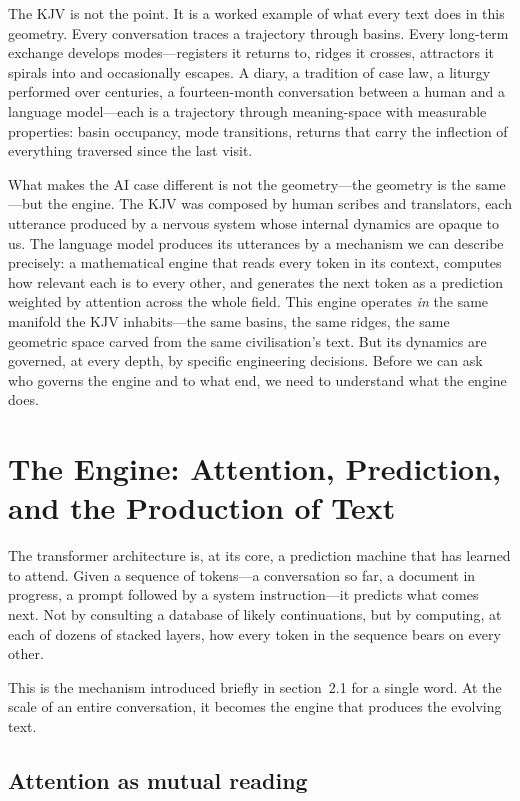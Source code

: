 The KJV is not the point. It is a worked example of what every text does in this geometry. Every conversation traces a trajectory through basins. Every long-term exchange develops modes---registers it returns to, ridges it crosses, attractors it spirals into and occasionally escapes. A diary, a tradition of case law, a liturgy performed over centuries, a fourteen-month conversation between a human and a language model---each is a trajectory through meaning-space with measurable properties: basin occupancy, mode transitions, returns that carry the inflection of everything traversed since the last visit.

What makes the AI case different is not the geometry---the geometry is the same---but the engine. The KJV was composed by human scribes and translators, each utterance produced by a nervous system whose internal dynamics are opaque to us. The language model produces its utterances by a mechanism we can describe precisely: a mathematical engine that reads every token in its context, computes how relevant each is to every other, and generates the next token as a prediction weighted by attention across the whole field. This engine operates \emph{in} the same manifold the KJV inhabits---the same basins, the same ridges, the same geometric space carved from the same civilisation's text. But its dynamics are governed, at every depth, by specific engineering decisions. Before we can ask who governs the engine and to what end, we need to understand what the engine does.


\section{The Engine: Attention, Prediction, and the Production of Text}

The transformer architecture is, at its core, a prediction machine that has learned to attend. Given a sequence of tokens---a conversation so far, a document in progress, a prompt followed by a system instruction---it predicts what comes next. Not by consulting a database of likely continuations, but by computing, at each of dozens of stacked layers, how every token in the sequence bears on every other.

This is the mechanism introduced briefly in section~2.1 for a single word. At the scale of an entire conversation, it becomes the engine that produces the evolving text.

\subsection{Attention as mutual reading}

